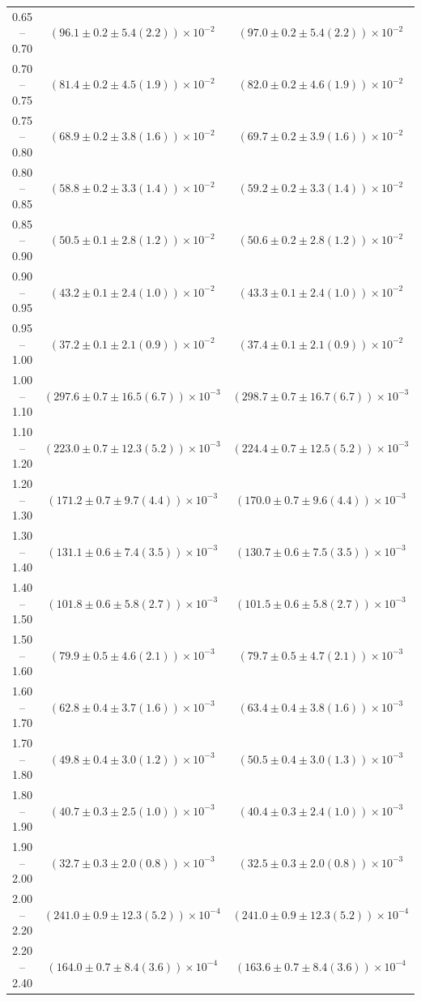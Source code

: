 \begin{table}
\begin{center}
\begin{tabular}{ c | c c }
0.65 -- 0.70 & $(96.1\pm0.2\pm5.4(2.2))\times10^{-2}$ & $(97.0\pm0.2\pm5.4(2.2))\times10^{-2}$ \\ 
0.70 -- 0.75 & $(81.4\pm0.2\pm4.5(1.9))\times10^{-2}$ & $(82.0\pm0.2\pm4.6(1.9))\times10^{-2}$ \\ 
0.75 -- 0.80 & $(68.9\pm0.2\pm3.8(1.6))\times10^{-2}$ & $(69.7\pm0.2\pm3.9(1.6))\times10^{-2}$ \\ 
0.80 -- 0.85 & $(58.8\pm0.2\pm3.3(1.4))\times10^{-2}$ & $(59.2\pm0.2\pm3.3(1.4))\times10^{-2}$ \\ 
0.85 -- 0.90 & $(50.5\pm0.1\pm2.8(1.2))\times10^{-2}$ & $(50.6\pm0.2\pm2.8(1.2))\times10^{-2}$ \\ 
0.90 -- 0.95 & $(43.2\pm0.1\pm2.4(1.0))\times10^{-2}$ & $(43.3\pm0.1\pm2.4(1.0))\times10^{-2}$ \\ 
0.95 -- 1.00 & $(37.2\pm0.1\pm2.1(0.9))\times10^{-2}$ & $(37.4\pm0.1\pm2.1(0.9))\times10^{-2}$ \\ 
1.00 -- 1.10 & $(297.6\pm0.7\pm16.5(6.7))\times10^{-3}$ & $(298.7\pm0.7\pm16.7(6.7))\times10^{-3}$ \\ 
1.10 -- 1.20 & $(223.0\pm0.7\pm12.3(5.2))\times10^{-3}$ & $(224.4\pm0.7\pm12.5(5.2))\times10^{-3}$ \\ 
1.20 -- 1.30 & $(171.2\pm0.7\pm9.7(4.4))\times10^{-3}$ & $(170.0\pm0.7\pm9.6(4.4))\times10^{-3}$ \\ 
1.30 -- 1.40 & $(131.1\pm0.6\pm7.4(3.5))\times10^{-3}$ & $(130.7\pm0.6\pm7.5(3.5))\times10^{-3}$ \\ 
1.40 -- 1.50 & $(101.8\pm0.6\pm5.8(2.7))\times10^{-3}$ & $(101.5\pm0.6\pm5.8(2.7))\times10^{-3}$ \\ 
1.50 -- 1.60 & $(79.9\pm0.5\pm4.6(2.1))\times10^{-3}$ & $(79.7\pm0.5\pm4.7(2.1))\times10^{-3}$ \\ 
1.60 -- 1.70 & $(62.8\pm0.4\pm3.7(1.6))\times10^{-3}$ & $(63.4\pm0.4\pm3.8(1.6))\times10^{-3}$ \\ 
1.70 -- 1.80 & $(49.8\pm0.4\pm3.0(1.2))\times10^{-3}$ & $(50.5\pm0.4\pm3.0(1.3))\times10^{-3}$ \\ 
1.80 -- 1.90 & $(40.7\pm0.3\pm2.5(1.0))\times10^{-3}$ & $(40.4\pm0.3\pm2.4(1.0))\times10^{-3}$ \\ 
1.90 -- 2.00 & $(32.7\pm0.3\pm2.0(0.8))\times10^{-3}$ & $(32.5\pm0.3\pm2.0(0.8))\times10^{-3}$ \\ 
2.00 -- 2.20 & $(241.0\pm0.9\pm12.3(5.2))\times10^{-4}$ & $(241.0\pm0.9\pm12.3(5.2))\times10^{-4}$ \\ 
2.20 -- 2.40 & $(164.0\pm0.7\pm8.4(3.6))\times10^{-4}$ & $(163.6\pm0.7\pm8.4(3.6))\times10^{-4}$ \\ 

\end{tabular}
\end{center}
\end{table}

